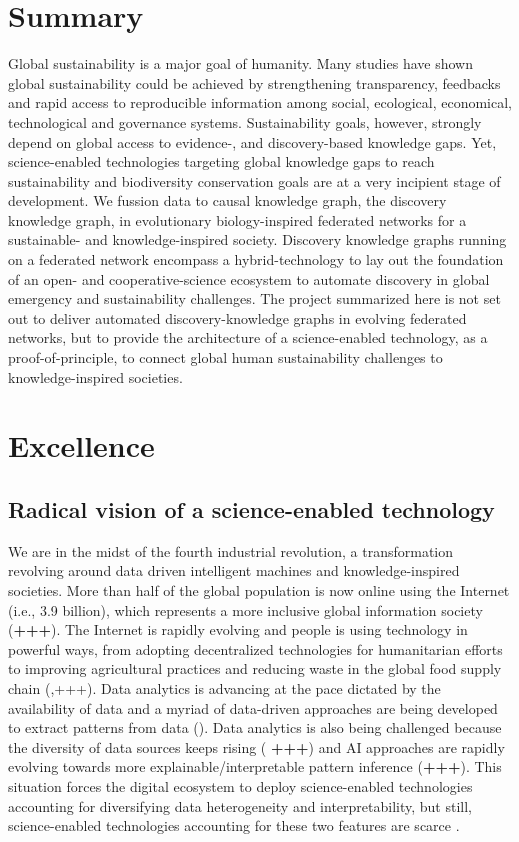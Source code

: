 \documentclass[11pt, a4paper]{article} %
\begin{document}
\section*{{\bf Summary}} Global sustainability is a major goal of
humanity. Many studies have shown global sustainability could be
achieved by strengthening transparency, feedbacks and rapid access to
reproducible information among social, ecological, economical,
technological and governance systems. Sustainability goals, however,
strongly depend on global access to evidence-, and discovery-based
knowledge gaps. Yet, science-enabled technologies targeting global
knowledge gaps to reach sustainability and biodiversity conservation
goals are at a very incipient stage of development. We fussion data to
causal knowledge graph, the discovery knowledge graph, in evolutionary
biology-inspired federated networks for a sustainable- and
knowledge-inspired society. Discovery knowledge graphs running on a
federated network encompass a hybrid-technology to lay out the
foundation of an open- and cooperative-science ecosystem to automate
discovery in global emergency and sustainability challenges. The
project summarized here is not set out to deliver automated
discovery-knowledge graphs in evolving federated networks, but to
provide the architecture of a science-enabled technology, as a
proof-of-principle, to connect global human sustainability challenges
to knowledge-inspired societies.
\section{Excellence}
\subsection{Radical vision of a science-enabled technology}
We are in the midst of the fourth industrial revolution, a
transformation revolving around data driven intelligent machines and
knowledge-inspired societies. More than half of the global population
is now online using the Internet (i.e., 3.9 billion), which represents
a more inclusive global information society ({\bf +++}). The Internet
is rapidly evolving and people is using technology in powerful ways,
from adopting decentralized technologies for humanitarian efforts to
improving agricultural practices and reducing waste in the global food
supply chain (\citep{Wilson2018},+++). Data analytics is advancing at
the pace dictated by the availability of data and a myriad of
data-driven approaches are being developed to extract patterns from
data (\citep{Schmidhuber:2015}). Data analytics is also being
challenged because the diversity of data sources keeps rising ({\bf
  +++}) and AI approaches are rapidly evolving towards more
explainable/interpretable pattern inference ({\bf +++}). This
situation forces the digital ecosystem to deploy science-enabled
technologies accounting for diversifying data heterogeneity and
interpretability, but still, science-enabled technologies accounting
for these two features are scarce \citep{RePEc}.
  
\end{document}
